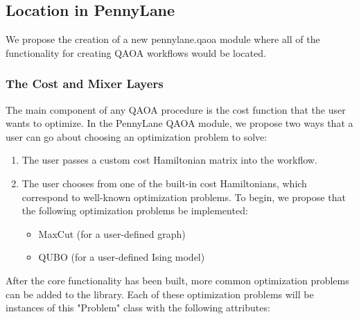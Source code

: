 \documentclass{article}
\begin{document}
\subsection{Location in PennyLane}

We propose the creation of a new pennylane.qaoa module where all of the functionality 
for creating QAOA workflows would be located.

\subsubsection{The Cost and Mixer Layers}

The main component of any QAOA procedure is the cost function that the user 
wants to optimize. In the PennyLane QAOA module, we propose two ways that a user 
can go about choosing an optimization problem to solve:

\begin{enumerate}
	\item The user passes a custom cost Hamiltonian matrix into the workflow.
	\item The user chooses from one of the built-in cost Hamiltonians, which 
              correspond to well-known optimization problems. To begin, we propose 
   	      that the following optimization problems be implemented:
	      \begin{itemize}
		      \item MaxCut (for a user-defined graph)
		      \item QUBO (for a user-defined Ising model)
		\end{itemize}
\end{enumerate}
  \noindent 
   After the core functionality has been built, more common optimization problems can be added 
   to the library.
\newline\newline
\noindent
Each of these optimization problems will
be instances of this "Problem" class with the following attributes:
\end{document}
